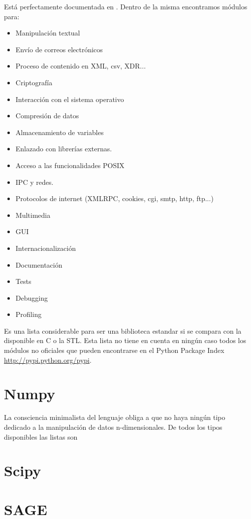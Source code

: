 \documentclass[a4paper,10pt]{article}
\begin{document}
Está perfectamente documentada en \cite{STB}. Dentro de la misma
encontramos módulos para:

\begin{itemize}
\item Manipulación textual
\item Envío de correos electrónicos
\item Proceso de contenido en XML, csv, XDR...
\item Criptografía
\item Interacción con el sistema operativo
\item Compresión de datos
\item Almacenamiento de variables
\item Enlazado con librerías externas.
\item Acceso a las funcionalidades POSIX
\item IPC y redes.
\item Protocolos de internet (XMLRPC, cookies, cgi, smtp, http, ftp...)
\item Multimedia
\item GUI
\item Internacionalización
\item Documentación
\item Tests
\item Debugging
\item Profiling
\end{itemize}

Es una lista considerable para ser una biblioteca estandar si se
compara con la disponible en C o la STL.  Esta lista no tiene en
cuenta en ningún caso todos los módulos no oficiales que pueden
encontrarse en el Python Package Index
\url{http://pypi.python.org/pypi}.
\section{Numpy}

La consciencia minimalista del lenguaje obliga a que no haya ningún
tipo dedicado a la manipulación de datos n-dimensionales. De todos los
tipos disponibles las listas son 

\section{Scipy}

\section{SAGE}
\end{document}
